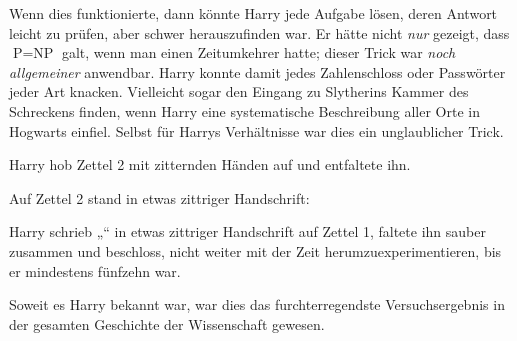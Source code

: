 Wenn dies funktionierte, dann könnte Harry jede Aufgabe lösen, deren Antwort leicht zu prüfen, aber schwer herauszufinden war. Er hätte nicht \emph{nur} gezeigt, dass $\mbox{P}=\mbox{NP}$ galt, wenn man einen Zeitumkehrer hatte; dieser Trick war \emph{noch allgemeiner} anwendbar. Harry konnte damit jedes Zahlenschloss oder Passwörter jeder Art knacken. Vielleicht sogar den Eingang zu Slytherins Kammer des Schreckens finden, wenn Harry eine systematische Beschreibung aller Orte in Hogwarts einfiel. Selbst für Harrys Verhältnisse war dies ein unglaublicher Trick.%

Harry hob Zettel 2 mit zitternden Händen auf und entfaltete ihn.

Auf Zettel 2 stand in etwas zittriger Handschrift:


Harry schrieb
„“ in etwas zittriger Handschrift auf Zettel 1, faltete ihn sauber zusammen und beschloss, nicht weiter mit der Zeit herumzuexperimentieren, bis er mindestens fünfzehn war.

Soweit es Harry bekannt war, war dies das furchterregendste Versuchsergebnis in der gesamten Geschichte der Wissenschaft gewesen.

